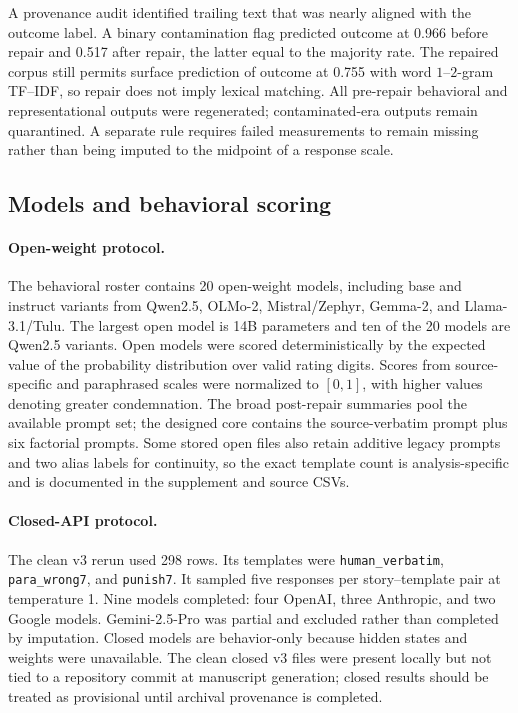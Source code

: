 \documentclass[11pt]{article}
\begin{document}
A provenance audit identified trailing text that was nearly aligned with the outcome label.
A binary contamination flag predicted outcome at 0.966 before repair and 0.517 after repair, the latter equal to the majority rate.
The repaired corpus still permits surface prediction of outcome at 0.755 with word $1$--$2$-gram TF--IDF, so repair does not imply lexical matching.
All pre-repair behavioral and representational outputs were regenerated; contaminated-era outputs remain quarantined.
A separate rule requires failed measurements to remain missing rather than being imputed to the midpoint of a response scale.

\subsection{Models and behavioral scoring}

\paragraph{Open-weight protocol.}
The behavioral roster contains 20 open-weight models, including base and instruct variants from Qwen2.5, OLMo-2, Mistral/Zephyr, Gemma-2, and Llama-3.1/Tulu.
The largest open model is 14B parameters and ten of the 20 models are Qwen2.5 variants.
Open models were scored deterministically by the expected value of the probability distribution over valid rating digits.
Scores from source-specific and paraphrased scales were normalized to $[0,1]$, with higher values denoting greater condemnation.
The broad post-repair summaries pool the available prompt set; the designed core contains the source-verbatim prompt plus six factorial prompts.
Some stored open files also retain additive legacy prompts and two alias labels for continuity, so the exact template count is analysis-specific and is documented in the supplement and source CSVs.

\paragraph{Closed-API protocol.}
The clean v3 rerun used 298 rows.
Its templates were \texttt{human\_verbatim}, \texttt{para\_wrong7}, and \texttt{punish7}.
It sampled five responses per story--template pair at temperature 1.
Nine models completed: four OpenAI, three Anthropic, and two Google models.
Gemini-2.5-Pro was partial and excluded rather than completed by imputation.
Closed models are behavior-only because hidden states and weights were unavailable.
The clean closed v3 files were present locally but not tied to a repository commit at manuscript generation; closed results should be treated as provisional until archival provenance is completed.
\end{document}

